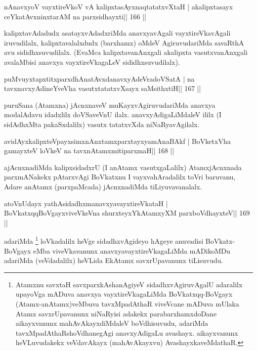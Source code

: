 
\begin{shl}
nAnavxyoV vayxtireVkoV vA kalipxtasAyxnaqtatatxvXtaH |
akalipxtasayx ceYkatAvxninxtarAM na parxsidhayxti\hfill || 166 ||
\end{shl}

\begin{artha}
kalipxtavAdadudx asatayxvAdadxriMda anavxyavAgali vayxtireVkavAgali 
iruvudilalx, kalipxtavalalxdudx (barxhamx) oMdeV AgiruvudariMda savaRthA avu sididhxsuvudilalx. (EvaMca kalipxtavanAnxgali akalipxta vasutxvanAnxgali avalaMbisi anavxya vayxtireVkagaLeV sididhxsuvudilalx).
\end{artha}


\begin{shl}
puMvuyxtapxtitxparxdhAnatAvxdanavxyAdeVradoVSatA |
na tavxnavxyAdineYveVha vasutxtatatxvXsayx saMsithxtiH\hfill || 167 ||
\end{shl}

\begin{artha}
puruSana (Atamxna) jAcnxnaveV muKayxvAgiruvudariMda anavxya modalAdavu idadxlilx doVSaveVnU ilalx. anavxyAdigaLiMdaleV ililx (I sidAdhxMta pakaSxdalilx) vasutx tatatxvXda niNaRyavAgilalx.
\end{artha}

\begin{shl}
avidAyxkalipxteV\s payxsimxnAnxtamxparxtayxyamAnaBAkf |
BoVketxVha gamayxteV loVkeV na tavxnAtamxmitiparxmaH\hfill || 168 ||
\end{shl}

\begin{artha}
ajAcnxnadiMda kalipxsidadxrU (I anAtamx vasutxgaLalilx) AtamxjAcnxnada  parxmANakekx pAtarxvAgi BoVkatxnu I vayxvahAradalilx toVri baruvanu, Adare anAtamx (parxpaMcada) jAcnxnadiMda tiLiyuvavanalalx.
\end{artha}

\begin{shl}
atoV\s nUdayx yathAsidadhxmanavxyavayxtireVkataH |
BoVkatxqqBoVgayxviveVkeVna shurxteyxYkAtamxyXM parxboVdhayxteV\hfill || 169 ||
\end{shl}

\begin{artha}
adariMda \footnote{Atamxnu savxtaH savxparxkAshanAgiyeV  sidadhxvAgiruvAgalU adaralilx upayoVga mADuva anavxya vayxtireVkagaLiMda BoVkatxqq-BoVgayx (Atamx-anAtamx)veMbuva tavxMpadAthaR viveVcane mADuva mUlaka Atamx savxrUpavanunx niNaRyisi adakekx parabarxhamxdoDane aikayxvanunx mahAvAkayxdiMdaleV boVdhisuvudu, adariMda tavxMpadAthaRshoVdhanegAgi anavxyAdigaLu avashayx. aikayxvanunx heVLuvudakekx veVdavAkayx (mahAvAkayxvu) AvashayxkaveMdathaR.} loVkadalilx heVge sidadhxvAgideyo hAgeye anuvadisi BoVkatx- BoVgayx eMba viveVkavanunx anavxyavayxtireVkagaLiMda mADikoMDu adariMda (veVdadalilx) heVLida EkAtamx savxrUpavanunx tiLisuvudu.
\end{artha}

